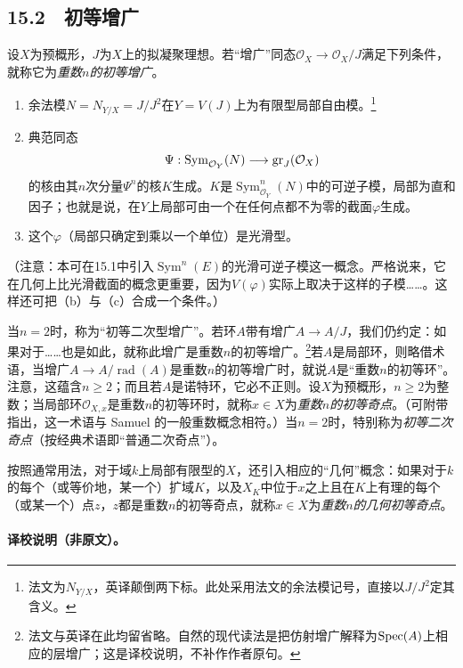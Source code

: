 \subsection*{15.2　初等增广}
\begingroup
\def\OO{\mathcal O}\def\m{\mathfrak m}\def\mm{\mathfrak m}\def\Sym{\operatorname{Sym}}
设$X$为预概形，$J$为$X$上的拟凝聚理想。若“增广”同态$\OO_X\to\OO_X/J$满足下列条件，就称它为\emph{重数$n$的初等增广}。
\begin{enumerate}
\item[(a)] 余法模$N=N_{Y/X}=J/J^2$在$Y=V(J)$上为有限型局部自由模。\footnote{法文为$N_{Y/X}$，英译颠倒两下标。此处采用法文的余法模记号，直接以$J/J^2$定其含义。}
\item[(b)] 典范同态
\[
\Psi:\Sym_{\OO_Y}(N)\longrightarrow\gr_J(\OO_X)
\]
的核由其$n$次分量$\Psi^n$的核$K$生成。$K$是$\Sym^n_{\OO_Y}(N)$中的可逆子模，局部为直和因子；也就是说，在$Y$上局部可由一个在任何点都不为零的截面$\varphi$生成。
\item[(c)] 这个$\varphi$（局部只确定到乘以一个单位）是光滑型。
\end{enumerate}
（注意：本可在15.1中引入$\Sym^n(E)$的光滑可逆子模这一概念。严格说来，它在几何上比光滑截面的概念更重要，因为$V(\varphi)$实际上取决于这样的子模……。这样还可把（b）与（c）合成一个条件。）

当$n=2$时，称为“初等二次型增广”。若环$A$带有增广$A\to A/J$，我们仍约定：如果对于……也是如此，就称此增广是重数$n$的初等增广。\footnote{法文与英译在此均留省略。自然的现代读法是把仿射增广解释为$\operatorname{Spec}(A)$上相应的层增广；这是译校说明，不补作作者原句。}若$A$是局部环，则略借术语，当增广$A\to A/\operatorname{rad}(A)$是重数$n$的初等增广时，就说$A$是“重数$n$的初等环”。注意，这蕴含$n\ge2$；而且若$A$是诺特环，它必不正则。设$X$为预概形，$n\ge2$为整数；当局部环$\OO_{X,x}$是重数$n$的初等环时，就称$x\in X$为\emph{重数$n$的初等奇点}。（可附带指出，这一术语与 Samuel 的一般重数概念相符。）当$n=2$时，特别称为\emph{初等二次奇点}（按经典术语即“普通二次奇点”）。

按照通常用法，对于域$k$上局部有限型的$X$，还引入相应的“几何”概念：如果对于$k$的每个（或等价地，某一个）扩域$K$，以及$X_K$中位于$x$之上且在$K$上有理的每个（或某一个）点$z$，$z$都是重数$n$的初等奇点，就称$x\in X$为\emph{重数$n$的几何初等奇点}。
\paragraph{译校说明（非原文）。}
